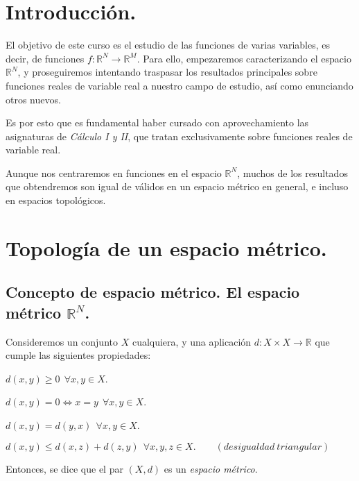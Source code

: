 \section*{Introducción.}

El objetivo de este curso es el estudio de las funciones de varias variables, es decir, de funciones $f: \mathbb{R}^N \longrightarrow \mathbb{R}^M$. Para ello, empezaremos caracterizando el espacio $\mathbb{R}^N$, y proseguiremos intentando traspasar los resultados principales sobre funciones reales de variable real a nuestro campo de estudio, así como enunciando otros nuevos.

Es por esto que es fundamental haber cursado con aprovechamiento las asignaturas de \emph{Cálculo I y II}, que tratan exclusivamente sobre funciones reales de variable real.

Aunque nos centraremos en funciones en el espacio $\mathbb{R}^N$, muchos de los resultados que obtendremos son igual de válidos en un espacio métrico en general, e incluso en espacios topológicos.

\newpage


\section{Topología de un espacio métrico.}

\subsection{Concepto de espacio métrico. El espacio métrico $\mathbb{R}^N$.}

\begin{ndef}
Consideremos un conjunto $X$ cualquiera, y una aplicación \mbox{$d:X\times X \longrightarrow \mathbb{R}$} que cumple las siguientes propiedades:

\begin{nlist}
\item $d(x,y) \ge 0\ \ \forall x,y \in X$.

\item $d(x,y) = 0 \iff x = y\ \ \forall x,y \in X$.

\item $d(x,y) = d(y,x)\ \ \forall x,y \in X$.

\item $d(x,y) \leq d(x,z) + d(z,y)\ \ \forall x,y,z \in X. \quad \quad(desigualdad\ triangular)$

\end{nlist}

Entonces, se dice que el par $(X,d)$ es un \emph{espacio métrico}.
\end{ndef}



